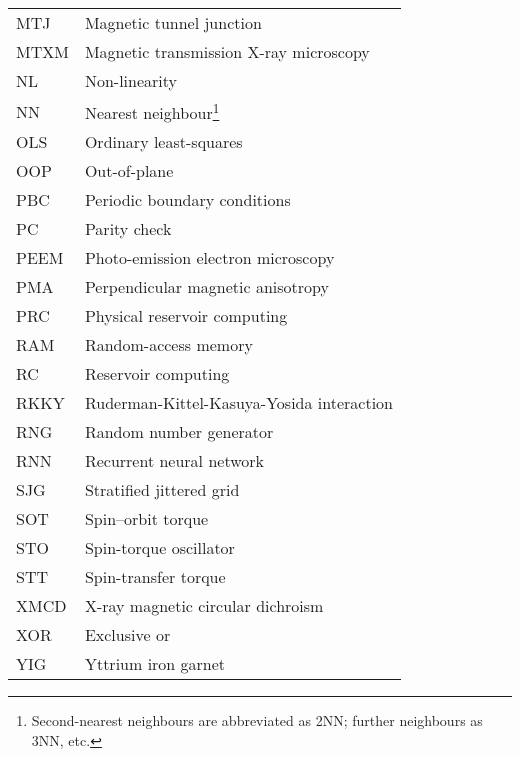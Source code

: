 {\begin{longtable}[l]{ll}
        MTJ   & Magnetic tunnel junction                    \\
        MTXM  & Magnetic transmission X-ray microscopy      \\
        NL    & Non-linearity                               \\
        NN    & Nearest neighbour\footnote{Second-nearest neighbours are abbreviated as 2NN; further neighbours as 3NN, etc.} \\
        OLS   & Ordinary least-squares                      \\
        OOP   & Out-of-plane                                \\
        PBC   & Periodic boundary conditions                \\
        PC    & Parity check                                \\
        PEEM  & Photo-emission electron microscopy          \\
        PMA   & Perpendicular magnetic anisotropy           \\
        PRC   & Physical reservoir computing                \\
        RAM   & Random-access memory                        \\
        RC    & Reservoir computing                         \\
        RKKY  & Ruderman-Kittel-Kasuya-Yosida interaction   \\
        RNG   & Random number generator                     \\
        RNN   & Recurrent neural network                    \\
        SJG   & Stratified jittered grid                    \\
        SOT   & Spin--orbit torque                           \\
        STO   & Spin-torque oscillator                      \\
        STT   & Spin-transfer torque                        \\
        XMCD  & X-ray magnetic circular dichroism           \\
        XOR   & Exclusive or                                \\
        YIG   & Yttrium iron garnet                         \\
    \end{longtable}
}
